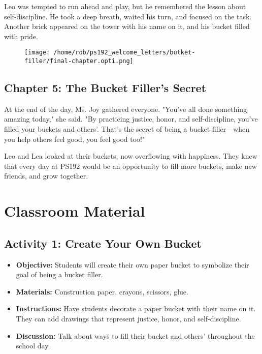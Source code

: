 \documentclass[11pt]{article}
\begin{document}
Leo was tempted to run ahead and play, but he remembered the lesson about self-discipline. He took a deep breath, waited his turn, and focused on the task. Another brick appeared on the tower with his name on it, and his bucket filled with pride.
\newpage
\begin{figure}[h]  %
  \centering \texttt{[image: /home/rob/ps192\_welcome\_letters/butket-filler/final-chapter.opti.png]}
  \label{fig:fronpage bottom_image}
\end{figure}
\subsection{Chapter 5: The Bucket Filler's Secret}
\label{sec:orgb6a557d}
At the end of the day, Ms. Joy gathered everyone. "You’ve all done something amazing today," she said. "By practicing justice, honor, and self-discipline, you’ve filled your buckets and others’. That’s the secret of being a bucket filler—when you help others feel good, you feel good too!"

Leo and Lea looked at their buckets, now overflowing with happiness. They knew that every day at PS192 would be an opportunity to fill more buckets, make new friends, and grow together.

\newpage
\section{Classroom Material}
\label{sec:org79a1bf5}
\subsection{Activity 1: Create Your Own Bucket}
\label{sec:org4b59c96}
\begin{itemize}
\item \textbf{\textbf{Objective:}} Students will create their own paper bucket to symbolize their goal of being a bucket filler.
\item \textbf{\textbf{Materials:}} Construction paper, crayons, scissors, glue.
\item \textbf{\textbf{Instructions:}} Have students decorate a paper bucket with their name on it. They can add drawings that represent justice, honor, and self-discipline.
\item \textbf{\textbf{Discussion:}} Talk about ways to fill their bucket and others' throughout the school day.
\end{itemize}
\end{document}
